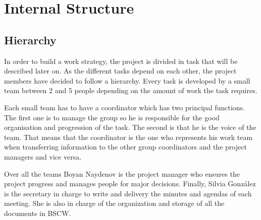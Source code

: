 \section{Internal Structure}


\subsection{Hierarchy}

In order to build a work strategy, the project is divided in task that will be described later on. As the different tasks depend on each other, the project members have decided to follow a hierarchy. Every task is developed by a small team between 2 and 5 people depending on the amount of work the task requires.
\newline

Each small team has to have a coordinator which has two principal functions. The first one is to manage the group so he is responsible for the good organisation and progression of the task. The second is that he is the voice of the team. That means that the coordinator is the one who represents his work team when transferring information to the other group coordinators and the project managers and vice versa.
\newline

Over all the teams Boyan Naydenov is the project manager who ensures the project progress and manages people for major decisions. Finally, Silvia Gonz\'{a}lez is the secretary in charge to write and delivery the minutes and agendas of each meeting. She is also in charge of the organization and storage of all the documents in BSCW. \newline
 
